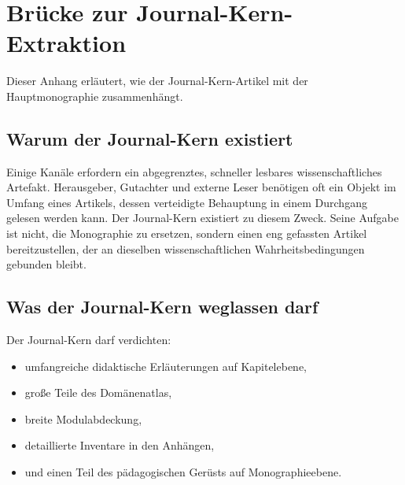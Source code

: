 \section{Brücke zur Journal-Kern-Extraktion}

Dieser Anhang erläutert, wie der Journal-Kern-Artikel mit der Hauptmonographie zusammenhängt.

\subsection{Warum der Journal-Kern existiert}

Einige Kanäle erfordern ein abgegrenztes, schneller lesbares wissenschaftliches Artefakt.
Herausgeber, Gutachter und externe Leser benötigen oft ein Objekt im Umfang eines Artikels, dessen verteidigte Behauptung
in einem Durchgang gelesen werden kann.
Der Journal-Kern existiert zu diesem Zweck.
Seine Aufgabe ist nicht, die Monographie zu ersetzen, sondern einen eng gefassten Artikel bereitzustellen, der an
dieselben wissenschaftlichen Wahrheitsbedingungen gebunden bleibt.

\subsection{Was der Journal-Kern weglassen darf}

Der Journal-Kern darf verdichten:

\begin{itemize}
\item umfangreiche didaktische Erläuterungen auf Kapitelebene,
\item große Teile des Domänenatlas,
\item breite Modulabdeckung,
\item detaillierte Inventare in den Anhängen,
\item und einen Teil des pädagogischen Gerüsts auf Monographieebene.
\end{itemize}

